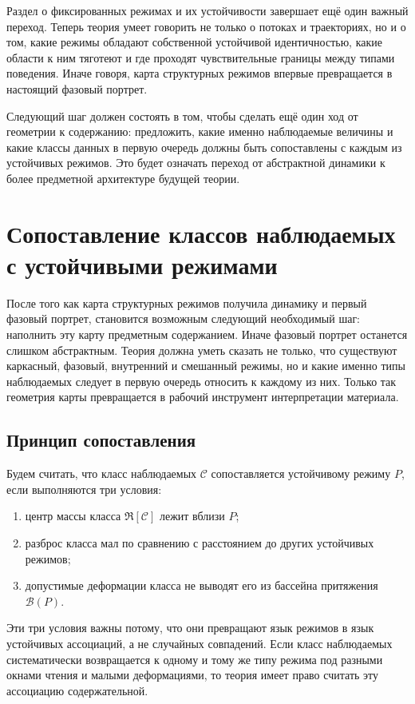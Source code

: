 \documentclass[12pt,a4paper]{article}
\begin{document}
Раздел о фиксированных режимах и их устойчивости завершает ещё один важный переход. Теперь теория умеет говорить не только о потоках и траекториях, но и о том, какие режимы обладают собственной устойчивой идентичностью, какие области к ним тяготеют и где проходят чувствительные границы между типами поведения. Иначе говоря, карта структурных режимов впервые превращается в настоящий фазовый портрет.

Следующий шаг должен состоять в том, чтобы сделать ещё один ход от геометрии к содержанию: предложить, какие именно наблюдаемые величины и какие классы данных в первую очередь должны быть сопоставлены с каждым из устойчивых режимов. Это будет означать переход от абстрактной динамики к более предметной архитектуре будущей теории.


\section{Сопоставление классов наблюдаемых с устойчивыми режимами}

После того как карта структурных режимов получила динамику и первый фазовый портрет, становится возможным следующий необходимый шаг: наполнить эту карту предметным содержанием. Иначе фазовый портрет останется слишком абстрактным. Теория должна уметь сказать не только, что существуют каркасный, фазовый, внутренний и смешанный режимы, но и какие именно типы наблюдаемых следует в первую очередь относить к каждому из них. Только так геометрия карты превращается в рабочий инструмент интерпретации материала.

\subsection{Принцип сопоставления}

Будем считать, что класс наблюдаемых \(\mathcal{C}\) сопоставляется устойчивому режиму \(P\), если выполняются три условия:
\begin{enumerate}
    \item центр массы класса \(\mathfrak{R}[\mathcal{C}]\) лежит вблизи \(P\);
    \item разброс класса мал по сравнению с расстоянием до других устойчивых режимов;
    \item допустимые деформации класса не выводят его из бассейна притяжения \(\mathcal{B}(P)\).
\end{enumerate}

Эти три условия важны потому, что они превращают язык режимов в язык устойчивых ассоциаций, а не случайных совпадений. Если класс наблюдаемых систематически возвращается к одному и тому же типу режима под разными окнами чтения и малыми деформациями, то теория имеет право считать эту ассоциацию содержательной.
\end{document}
